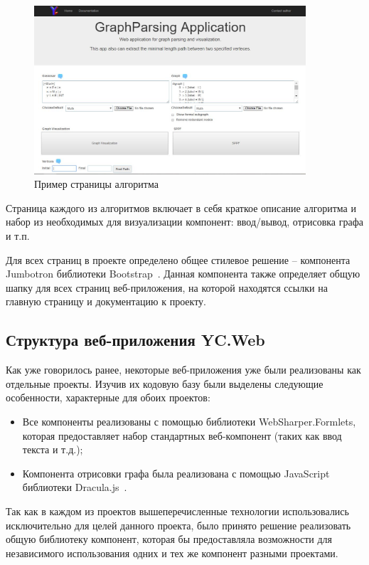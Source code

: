 \documentclass[14pt]{matmex-diploma}
\begin{document}
\begin{figure}[h]
\label{2}
\centering
\includegraphics[width=0.9\textwidth]{pictures/alg.jpg}
\caption{Пример страницы алгоритма}
\end{figure}

\newpage

Страница каждого из алгоритмов включает в себя краткое описание алгоритма и набор из необходимых для визуализации компонент: ввод/вывод, отрисовка графа и т.п.	

Для всех страниц в проекте определено общее стилевое решение -- компонента Jumbotron библиотеки Bootstrap~\cite{bootstrap}. Данная компонента также определяет общую шапку для всех страниц веб-приложения, на которой находятся ссылки на главную страницу и документацию к проекту.

\newpage
\subsection{Структура веб-приложения YC.Web}

Как уже говорилось ранее, некоторые веб-приложения уже были реализованы как отдельные проекты. Изучив их кодовую базу были выделены следующие особенности, характерные для обоих проектов:

\begin{itemize}
    \item Все компоненты реализованы с помощью библиотеки 
    \linebreak WebSharper.Formlets, которая предоставляет набор стандартных веб-компонент (таких как ввод текста и т.д.);
    \item Компонента отрисовки графа была реализована с помощью JavaScript библиотеки Dracula.js~\cite{dracula}.
\end{itemize}


Так как в каждом из проектов вышеперечисленные технологии использовались исключительно для целей данного проекта, было принято решение реализовать общую библиотеку компонент, которая бы предоставляла возможности для независимого использования одних и тех же компонент разными проектами.
\end{document}

